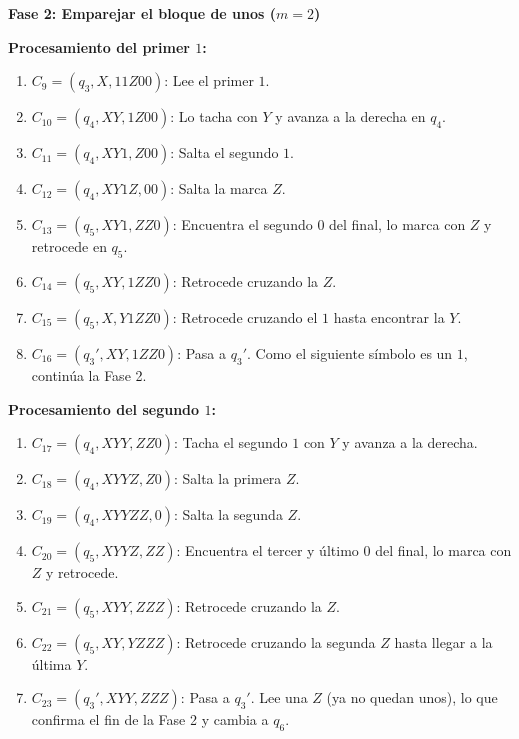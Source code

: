 \noindent\textbf{Fase 2: Emparejar el bloque de unos ($m = 2$)}

\vspace{0.2cm}
\noindent\textbf{Procesamiento del primer $1$:}
\begin{enumerate}[label=\arabic*., start=9, leftmargin=*]
    \item $C_9 = (q_3, X, 11Z00)$: Lee el primer $1$.
    \item $C_{10} = (q_4, XY, 1Z00)$: Lo tacha con $Y$ y avanza a la derecha en $q_4$.
    \item $C_{11} = (q_4, XY1, Z00)$: Salta el segundo $1$.
    \item $C_{12} = (q_4, XY1Z, 00)$: Salta la marca $Z$.
    \item $C_{13} = (q_5, XY1, ZZ0)$: Encuentra el segundo $0$ del final, lo marca con $Z$ y retrocede en $q_5$.
    \item $C_{14} = (q_5, XY, 1ZZ0)$: Retrocede cruzando la $Z$.
    \item $C_{15} = (q_5, X, Y1ZZ0)$: Retrocede cruzando el $1$ hasta encontrar la $Y$.
    \item $C_{16} = (q_3', XY, 1ZZ0)$: Pasa a $q_3'$. Como el siguiente símbolo es un $1$, continúa la Fase 2.
\end{enumerate}

\vspace{0.2cm}
\noindent\textbf{Procesamiento del segundo $1$:}
\begin{enumerate}[label=\arabic*., start=17, leftmargin=*]
    \item $C_{17} = (q_4, XYY, ZZ0)$: Tacha el segundo $1$ con $Y$ y avanza a la derecha.
    \item $C_{18} = (q_4, XYYZ, Z0)$: Salta la primera $Z$.
    \item $C_{19} = (q_4, XYYZZ, 0)$: Salta la segunda $Z$.
    \item $C_{20} = (q_5, XYYZ, ZZ)$: Encuentra el tercer y último $0$ del final, lo marca con $Z$ y retrocede.
    \item $C_{21} = (q_5, XYY, ZZZ)$: Retrocede cruzando la $Z$.
    \item $C_{22} = (q_5, XY, YZZZ)$: Retrocede cruzando la segunda $Z$ hasta llegar a la última $Y$.
    \item $C_{23} = (q_3', XYY, ZZZ)$: Pasa a $q_3'$. Lee una $Z$ (ya no quedan unos), lo que confirma el fin de la Fase 2 y cambia a $q_6$.
\end{enumerate}


